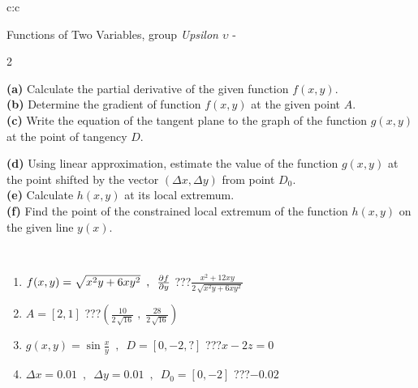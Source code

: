 \documentclass[10pt]{report}
\begin{document}
\begin{tabular}{c:c}
\begin{minipage}[c][104.5mm][t]{0.5\linewidth}
\begin{center}
\vspace{7mm}
{\huge \LARGE Functions of Two Variables, group \textit{Upsilon $\upsilon$} -}\\[5mm]
\begin{minipage}{0.95\linewidth}
\begin{center}
{\small \begin{multicols}{2} \raggedright
\textbf{(a)} Calculate the partial derivative of the given function \(f(x,y)\). \\[1mm]
\textbf{(b)} Determine the gradient of function \(f(x,y)\) at the given point \(A\). \\[1mm]
\textbf{(c)} Write the equation of the tangent plane to the graph of the function \(g(x,y)\) at the point of tangency \(D\). \par \columnbreak
\textbf{(d)} Using linear approximation, estimate the value of the function \(g(x,y)\) at the point shifted by the vector \((\Delta x, \Delta y)\) from point \(D_0\). \\[1mm]
\textbf{(e)} Calculate \(h(x,y)\) at its local extremum. \\[1mm]
\textbf{(f)} Find the point of the constrained local extremum of the function \(h(x,y)\) on the given line \(y(x)\). \\[1mm]
\end{multicols}
}
\end{center}
\end{minipage}
\\[4mm]
\begin{minipage}{0.79\linewidth}
\begin{center}
\begin{varwidth}{\linewidth}
\begin{enumerate}
\normalsizerr
\item $f(x,y) = \sqrt{x^2y + 6xy^2}\enspace , \enspace \pdv{f}{y}$\quad \dotfill\; ???\;\dotfill \quad $\frac{x^2+12xy}{2\,\sqrt{x^2y+6xy^2}}$
\item $A = [2, 1]$\quad \dotfill\; ???\;\dotfill \quad $\left( \frac{10}{2\,\sqrt{16}} \;,\; \frac{28}{2\,\sqrt{16}} \right)$
\item $g(x,y) = \sin\frac{x}{y} \enspace , \enspace D = [0, -2, ?]$\quad \dotfill\; ???\;\dotfill \quad $x-2z=0$
\item $\Delta x = {0.01} \enspace,\enspace \Delta y = {0.01} \enspace,\enspace D_0 = [0,-2]$\quad \dotfill\; ???\;\dotfill \quad $-0.02$

\end{enumerate}
\end{varwidth}
\end{center}
\end{minipage}
\end{center}
\end{minipage}
\end{tabular}
\end{document}
